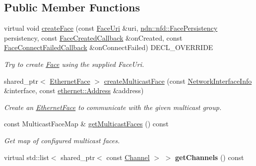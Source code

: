 \subsection*{Public Member Functions}
\begin{DoxyCompactItemize}
\item 
virtual void \hyperlink{classnfd_1_1EthernetFactory_a6e89157070fdaad6cccbb43a15e5d730}{create\+Face} (const \hyperlink{classndn_1_1util_1_1FaceUri}{Face\+Uri} \&uri, \hyperlink{group__management_ga05df4b7c484a0fae25d3e65962511bac}{ndn\+::nfd\+::\+Face\+Persistency} persistency, const \hyperlink{namespacenfd_a6d4b91580c829552a452c53458381b0f}{Face\+Created\+Callback} \&on\+Created, const \hyperlink{namespacenfd_ae87d4f07de26f4939691439b51f2dd83}{Face\+Connect\+Failed\+Callback} \&on\+Connect\+Failed) D\+E\+C\+L\+\_\+\+O\+V\+E\+R\+R\+I\+DE
\begin{DoxyCompactList}\small\item\em Try to create \hyperlink{classnfd_1_1Face}{Face} using the supplied Face\+Uri. \end{DoxyCompactList}\item 
shared\+\_\+ptr$<$ \hyperlink{classnfd_1_1EthernetFace}{Ethernet\+Face} $>$ \hyperlink{classnfd_1_1EthernetFactory_a87afc762540cae4c6f2fc95029fb316e}{create\+Multicast\+Face} (const \hyperlink{classnfd_1_1NetworkInterfaceInfo}{Network\+Interface\+Info} \&interface, const \hyperlink{classndn_1_1util_1_1ethernet_1_1Address}{ethernet\+::\+Address} \&address)
\begin{DoxyCompactList}\small\item\em Create an \hyperlink{classnfd_1_1EthernetFace}{Ethernet\+Face} to communicate with the given multicast group. \end{DoxyCompactList}\item 
const Multicast\+Face\+Map \& \hyperlink{classnfd_1_1EthernetFactory_a6ff0a61e8ae82f52f93abb38054f66f3}{get\+Multicast\+Faces} () const\hypertarget{classnfd_1_1EthernetFactory_a6ff0a61e8ae82f52f93abb38054f66f3}{}\label{classnfd_1_1EthernetFactory_a6ff0a61e8ae82f52f93abb38054f66f3}

\begin{DoxyCompactList}\small\item\em Get map of configured multicast faces. \end{DoxyCompactList}\item 
virtual std\+::list$<$ shared\+\_\+ptr$<$ const \hyperlink{classnfd_1_1Channel}{Channel} $>$ $>$ {\bfseries get\+Channels} () const\hypertarget{classnfd_1_1EthernetFactory_a1222670e2d3e8daa0e5a6334d25c3af3}{}\label{classnfd_1_1EthernetFactory_a1222670e2d3e8daa0e5a6334d25c3af3}

\end{DoxyCompactItemize}


